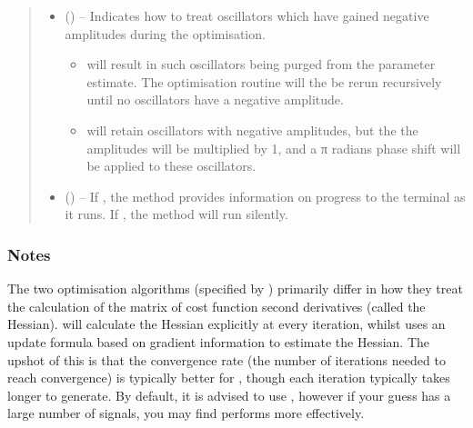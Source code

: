 \documentclass[letterpaper,10pt,english]{sphinxmanual}
\begin{document}
\begin{fulllineitems}
\begin{quote}
\begin{description}
\begin{itemize}
\item {} 
\sphinxAtStartPar
{} (\sphinxstyleliteralemphasis{\sphinxupquote{, }}) – 
\sphinxAtStartPar
Indicates how to treat oscillators which have gained negative
amplitudes during the optimisation.
\begin{itemize}
\item {} 
\sphinxAtStartPar
{} will result in such oscillators being purged from
the parameter estimate. The optimisation routine will the be
re\sphinxhyphen{}run recursively until no oscillators have a negative amplitude.

\item {} 
\sphinxAtStartPar
{} will retain oscillators with negative amplitudes,
but the the amplitudes will be multiplied by \sphinxhyphen{}1, and a π radians
phase shift will be applied to these oscillators.

\end{itemize}


\item {} 
\sphinxAtStartPar
{} (\sphinxstyleliteralemphasis{\sphinxupquote{, }}) – If , the method provides information on progress to
the terminal as it runs. If , the method will run silently.

\end{itemize}

\end{description}\end{quote}
\subsubsection*{Notes}

\sphinxAtStartPar
The two optimisation algorithms (specified by ) primarily
differ in how they treat the calculation of the matrix of cost
function second derivatives (called the Hessian). 
will calculate the Hessian explicitly at every iteration, whilst
 uses an update formula based on gradient information to
estimate the Hessian. The upshot of this is that the convergence
rate (the number of iterations needed to reach convergence) is
typically better for , though each iteration
typically takes longer to generate. By default, it is advised to
use , however if your guess has a large number
of signals, you may find  performs more effectively.


\end{fulllineitems}
\end{document}
